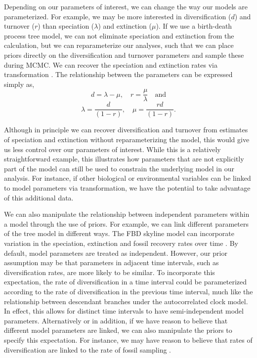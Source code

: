 Depending on our parameters of interest, we can change the way our models are parameterized.
For example, we may be more interested in diversification ($d$) and turnover ($r$) than speciation ($\lambda$) and extinction ($\mu$).
If we use a birth-death process tree model, we can not eliminate speciation and extinction from the calculation, but we can reparameterize our analyses, such that we can place priors directly on the diversification and turnover parameters and sample these during MCMC. We can recover the speciation and extinction rates via transformation \citep{Heath2014}.
The relationship between the parameters can be expressed simply as, 
$$d = \lambda - \mu, \quad r = \frac{\mu}{\lambda} \quad \textrm{and} $$ 
$$\lambda = \frac{d}{(1-r)}, \quad \mu = \frac{rd}{(1 - r)}.$$

Although in principle we can recover diversification and turnover from estimates of speciation and extinction without reparameterizing the model, this would give us less control over our parameters of interest. 
While this is a relatively straightforward example, this illustrates how parameters that are not explicitly part of the model can still be used to constrain the underlying model in our analysis. 
For instance, if other biological or environmental variables %
can be linked to model parameters via transformation, we have the potential to take advantage of this additional data.

We can also manipulate the relationship between independent parameters within a model through the use of priors.
For example, we can link different parameters of the tree model in different ways.
The FBD skyline model can incorporate variation in the speciation, extinction and fossil recovery rates over time \citep{Gavryushkina2014,Zhang2016}.
By default, model parameters are treated as independent.
However, our prior assumption may be that parameters in adjacent time intervals, such as diversification rates, are more likely to be similar.
To incorporate this expectation, the rate of diversification in a time interval could be parameterized according to the rate of diversification in the previous time interval, much like the relationship between descendant branches under the autocorrelated clock model. 
In effect, this allows for distinct time intervals to have semi-independent model parameters.
Alternatively or in addition, if we have reason to believe that different model parameters are linked, we can also manipulate the priors to specify this expectation.
For instance, we may have reason to believe that rates of diversification are linked to the rate of fossil sampling \citep{Holland1995,Peters2005}.

